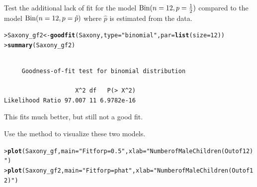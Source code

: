 \documentclass[10pt]{report}\usepackage[]{graphicx}\usepackage[]{color}
\makeatletter
\newcommand{\hlnum}[1]{\textcolor[rgb]{0.686,0.059,0.569}{#1}}%
\newcommand{\hlstr}[1]{\textcolor[rgb]{0.192,0.494,0.8}{#1}}%
\newcommand{\hlstd}[1]{\textcolor[rgb]{0.345,0.345,0.345}{#1}}%
\newcommand{\hlkwb}[1]{\textcolor[rgb]{0.69,0.353,0.396}{#1}}%
\newcommand{\hlkwc}[1]{\textcolor[rgb]{0.333,0.667,0.333}{#1}}%
\newcommand{\hlkwd}[1]{\textcolor[rgb]{0.737,0.353,0.396}{\textbf{#1}}}%
\newenvironment{kframe}{%
 \def\at@end@of@kframe{}%
 \ifinner\ifhmode%
  \def\at@end@of@kframe{\end{minipage}}%
  \begin{minipage}{\columnwidth}%
 \fi\fi%
 \def\FrameCommand##1{\hskip\@totalleftmargin \hskip-\fboxsep
 \colorbox{shadecolor}{##1}\hskip-\fboxsep
     \hskip-\linewidth \hskip-\@totalleftmargin \hskip\columnwidth}%
 \MakeFramed {\advance\hsize-\width
   \@totalleftmargin\z@ \linewidth\hsize
   \@setminipage}}%
 {\par\unskip\endMakeFramed%
 \at@end@of@kframe}
\newenvironment{knitrout}{}{} %
\renewenvironment{knitrout}{\small\renewcommand{\baselinestretch}{.85}}{} %
\makeatother
\begin{document}
\begin{Exercises}
\begin{enumerate*}
    \item Test the additional lack of fit for the model $\Bin(n=12, p=\frac12)$
    compared to the model $\Bin(n=12, p=\hat{p})$ where $\hat{p}$ is estimated
    from the data.
    \begin{ans}
\begin{knitrout}\footnotesize
{}\color{fgcolor}\begin{kframe}
\begin{alltt}
\hlstd{> }\hlstd{Saxony_gf2} \hlkwb{<-} \hlkwd{goodfit}\hlstd{(Saxony,} \hlkwc{type} \hlstd{=} \hlstr{"binomial"}\hlstd{,} \hlkwc{par}\hlstd{=}\hlkwd{list}\hlstd{(}\hlkwc{size}\hlstd{=}\hlnum{12}\hlstd{))}
\hlstd{> }\hlkwd{summary}\hlstd{(Saxony_gf2)}
\end{alltt}
\begin{verbatim}

	 Goodness-of-fit test for binomial distribution

                    X^2 df   P(> X^2)
Likelihood Ratio 97.007 11 6.9782e-16
\end{verbatim}
\end{kframe}
\end{knitrout}
    This fits much better, but still not a good fit. 
    \end{ans}
    
    \item Use the  method to visualize these two models.
    \begin{ans}
\begin{knitrout}\footnotesize
{}\color{fgcolor}\begin{kframe}
\begin{alltt}
\hlstd{> }\hlkwd{plot}\hlstd{(Saxony_gf,} \hlkwc{main} \hlstd{=} \hlstr{"Fit for p=0.5"}\hlstd{,} \hlkwc{xlab} \hlstd{=} \hlstr{"Number of Male Children (Out of 12)"}\hlstd{)}
\hlstd{> }\hlkwd{plot}\hlstd{(Saxony_gf2,} \hlkwc{main} \hlstd{=} \hlstr{"Fit for p=phat"}\hlstd{,} \hlkwc{xlab} \hlstd{=} \hlstr{"Number of Male Children (Out of 12)"}\hlstd{)}
\end{alltt}
\end{kframe}


\end{knitrout}
\end{ans}
\end{enumerate*}
\end{Exercises}
\end{document}

